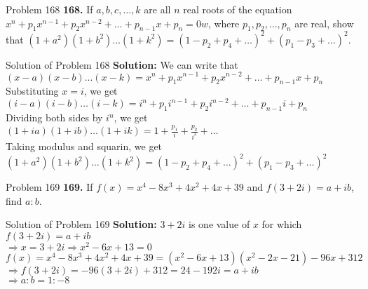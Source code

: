\documentclass[aspectratio=169,8pt]{beamer}
\begin{document}
\begin{frame}{Problem 168}
  \textbf{168.} If $a, b, c, \ldots, k$ are all $n$ real roots of the equation $x^n + p_1x^{n - 1} + p_2x^{n - 2} + \ldots + p_{n -
  1}x + p_n = 0w$, where $p_1, p_2, \ldots, p_n$ are real, show that $(1 + a^2)(1 + b^2)\ldots (1 + k^2) = (1 - p_2 + p_4 +
  \ldots)^2 + (p_1 - p_3 + \ldots)^2$.
\end{frame}
\begin{frame}{Solution of Problem 168}
  \textbf{Solution:} We can write that $(x - a)(x - b)\ldots (x - k) = x^n + p_1x^{n - 1} + p_2x^{n - 2} + \ldots + p_{n - 1}x +
  p_n$\\
  \vspace*{0.2cm}
  Substituting $x = i$, we get\\
  \vspace*{0.2cm}
  $(i - a)(i - b)\ldots (i - k) = i^n + p_1i^{n - 1} + p_2i^{n - 2} + \ldots + p_{n - 1}i +  p_n$\\
  \vspace*{0.2cm}
  Dividing both sides by $i^n$, we get
  $(1 + ia)(1 + ib)\ldots(1 + ik) = 1 + \frac{p_1}{i} + \frac{p_2}{i^2} + \ldots$\\
  \vspace*{0.2cm}
  Taking modulus and squarin, we get\\
  \vspace*{0.2cm}
  $(1 + a^2)(1 + b^2)\ldots (1 + k^2) = (1 - p_2 + p_4 + \ldots)^2 + (p_1 - p_3 + \ldots)^2$
\end{frame}
\begin{frame}{Problem 169}
  \textbf{169.} If $f(x) = x^4 - 8x^3 + 4x^2 + 4x + 39$ and $f(3 + 2i) = a + ib$,
  find $a:b$.
\end{frame}
\begin{frame}{Solution of Problem 169}
  \textbf{Solution:} $3 + 2i$ is one value of $x$ for which $f(3 + 2i) = a + ib$\\
  \vspace*{0.2cm}
  $\Rightarrow x = 3 + 2i \Rightarrow x^2 - 6x + 13 = 0$\\
  \vspace*{0.2cm}
  $f(x) = x^4 - 8x^3 + 4x^2 + 4x + 39 = (x^2 - 6x + 13)(x^2 - 2x -21) -96x + 312$\\
  \vspace*{0.2cm}
  $\Rightarrow f(3 + 2i) = -96(3 + 2i) + 312 = 24 - 192i = a + ib$\\
  \vspace*{0.2cm}
  $\Rightarrow a:b = 1:-8$
\end{frame}
\end{document}
